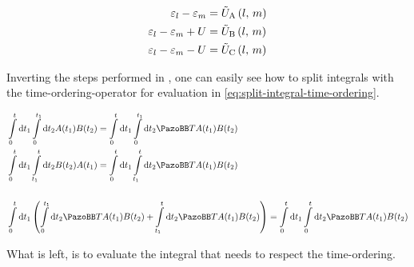 \begin{equation}
    \label{eq:u-eps-substitution}
    \begin{split}
        \epsl-\epsl[m] &= \ueps{A}{l}{m}\\
        \epsl-\epsl[m]+U &= \ueps{B}{l}{m}\\
        \epsl-\epsl[m]-U &= \ueps{C}{l}{m}\\
    \end{split}
\end{equation}

Inverting the steps performed in \cite{dissectTimeOrderingIntegrals}, one can easily see how to split integrals with the time-ordering-operator for evaluation in \autoref{eq:split-integral-time-ordering}.

\begin{equation}
    \label{eq:split-integral-time-ordering}
    \begin{split}
        &\int\limits_0^t \mathrm{d}t_1 \int\limits_0^{t_1} \mathrm{d}t_2 A(t_1) B(t_2)  = \int\limits_0^t \mathrm{d}t_1 \int\limits_0^{t_1} \mathrm{d}t_2  \timeOrderingOperator A(t_1) B(t_2) \\
        &\int\limits_0^t \mathrm{d}t_1 \int\limits_{t_1}^t \mathrm{d}t_2  B(t_2) A(t_1)  = \int\limits_0^t \mathrm{d}t_1 \int\limits_{t_1}^t \mathrm{d}t_2  \timeOrderingOperator A(t_1) B(t_2) \\\\
        &\int\limits_0^t \mathrm{d}t_1 \left( \int\limits_0^{t_1} \mathrm{d}t_2 \timeOrderingOperator A(t_1) B(t_2) +  \int\limits_{t_1}^t \mathrm{d}t_2 \timeOrderingOperator A(t_1) B(t_2)\right) =
        \int\limits_0^t \mathrm{d}t_1\int\limits_0^t \mathrm{d}t_2 \timeOrderingOperator A(t_1) B(t_2)
    \end{split}
\end{equation}

What is left, is to evaluate the integral that needs to respect the time-ordering.

